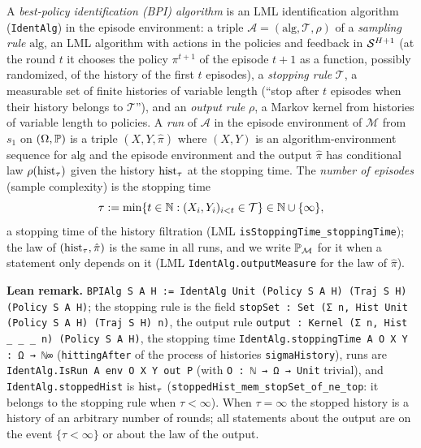 \begin{definition}\label{def:bpi_alg}
\leanok
{}
A \emph{best-policy identification (BPI) algorithm} is an LML identification algorithm
(\texttt{IdentAlg}) in the episode environment: a triple $\mathcal A = (\mathrm{alg}, \mathcal T, \rho)$
of a \emph{sampling rule} $\mathrm{alg}$, an LML algorithm with actions in the policies and
feedback in $\mathcal{S}^{H+1}$ (at the round $t$ it chooses the policy $\pi^{t+1}$ of the episode
$t + 1$ as a function, possibly randomized, of the history of the first $t$ episodes), a
\emph{stopping rule} $\mathcal T$, a measurable set of finite histories of variable length
(``stop after $t$ episodes when their history belongs to $\mathcal T$''), and an \emph{output
rule} $\rho$, a Markov kernel from histories of variable length to policies. A \emph{run} of
$\mathcal A$ in the episode environment of $\mathcal M$ from $s_1$ on $(\Omega, \mathbb{P})$ is a triple
$(X, Y, \hat\pi)$ where $(X, Y)$ is an algorithm-environment sequence for $\mathrm{alg}$ and the
episode environment and the output $\hat\pi$ has conditional law $\rho(\mathrm{hist}_\tau)$ given the
history $\mathrm{hist}_\tau$ at the stopping time. The \emph{number of episodes} (sample complexity) is
the stopping time
\[
  \tau := \min\{t \in \mathbb{N} : (X_i, Y_i)_{i < t} \in \mathcal T\} \in \mathbb{N} \cup \{\infty\} ,
\]
a stopping time of the history filtration (LML \texttt{isStoppingTime\_stoppingTime}); the law of
$(\mathrm{hist}_\tau, \hat\pi)$ is the same in all runs, and we write $\mathbb{P}_{\mathcal M}$ for it when a
statement only depends on it (LML \texttt{IdentAlg.outputMeasure} for the law of $\hat\pi$).
\end{definition}

\textbf{Lean remark.} \texttt{BPIAlg S A H := IdentAlg Unit (Policy S A H) (Traj S H) (Policy S A H)};
the stopping rule is the field \texttt{stopSet : Set (Σ n, Hist Unit (Policy S A H) (Traj S H) n)},
the output rule \texttt{output : Kernel (Σ n, Hist \_ \_ \_ n) (Policy S A H)}, the stopping time
\texttt{IdentAlg.stoppingTime A O X Y : Ω → ℕ∞} (\texttt{hittingAfter} of the process of
histories \texttt{sigmaHistory}), runs are \texttt{IdentAlg.IsRun A env O X Y out P} (with
\texttt{O : ℕ → Ω → Unit} trivial), and \texttt{IdentAlg.stoppedHist} is $\mathrm{hist}_\tau$
(\texttt{stoppedHist\_mem\_stopSet\_of\_ne\_top}: it belongs to the stopping rule when
$\tau < \infty$). When $\tau = \infty$ the stopped history is a history of an arbitrary
number of rounds; all statements about the output are on the event $\{\tau < \infty\}$ or
about the law of the output.

